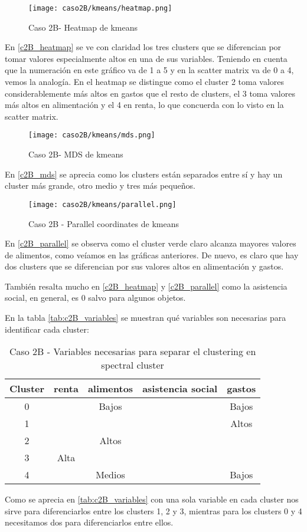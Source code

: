 \begin{figure}[H]
\caption{Caso 2B- Heatmap de kmeans}
\label{c2B_heatmap}
\texttt{[image: caso2B/kmeans/heatmap.png]}
\end{figure}

En \eqref{c2B_heatmap} se ve con claridad los tres clusters que se diferencian por tomar valores especialmente altos en una de sus variables. Teniendo en cuenta que la numeración en este gráfico va de 1 a 5 y en la scatter matrix va de 0 a 4, vemos la analogía. En el heatmap se distingue como el cluster 2 toma valores considerablemente más altos en gastos que el resto de clusters, el 3 toma valores más altos en alimentación y el 4 en renta, lo que concuerda con lo visto en la scatter matrix.


\begin{figure}[H]
\caption{Caso 2B- MDS de kmeans}
\label{c2B_mds}
\texttt{[image: caso2B/kmeans/mds.png]}
\end{figure}

En \eqref{c2B_mds} se aprecia como los clusters están separados entre sí y hay un cluster más grande, otro medio y tres más pequeños.

\begin{figure}[H]
\caption{Caso 2B - Parallel coordinates de kmeans}
\label{c2B_parallel}
\texttt{[image: caso2B/kmeans/parallel.png]}
\end{figure}

En \eqref{c2B_parallel} se observa como el cluster verde claro  alcanza mayores valores de alimentos, como veíamos en las gráficas anteriores. De nuevo, es claro que hay dos clusters que se diferencian por sus valores altos en alimentación y gastos.

También resalta mucho en \eqref{c2B_heatmap} y \eqref{c2B_parallel} como la asistencia social, en general, es 0 salvo para algunos objetos.

En la tabla  \eqref{tab:c2B_variables} se muestran qué variables son necesarias para identificar cada cluster:

\begin{table}[H]
\centering
\caption{Caso 2B - Variables necesarias para separar el clustering en spectral cluster}
\label{tab:c2B_variables}
\begin{tabular}{ccccc}
\toprule
 Cluster & renta & alimentos & asistencia social & gastos \\
\midrule
0 & & Bajos & & Bajos \\
1 & & & & Altos \\
2 & & Altos & & \\
3 & Alta & & & \\
4 & & Medios & & Bajos \\
\bottomrule
\end{tabular}
\end{table}
Como se aprecia en \eqref{tab:c2B_variables} con una sola variable en cada cluster nos sirve para diferenciarlos entre los clusters 1, 2 y 3, mientras para los clusters 0 y 4 necesitamos dos para diferenciarlos entre ellos.

